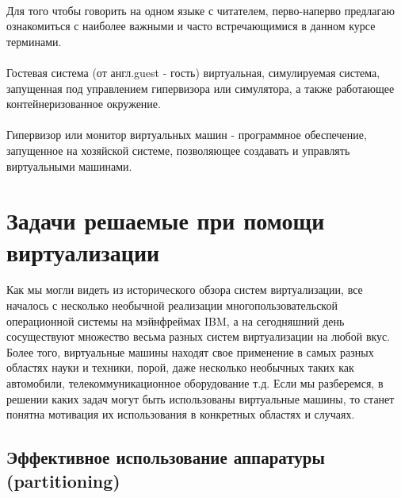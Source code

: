 \documentclass[14pt, a4paper]{article}
\begin{document}
\\

\noindent Для того чтобы говорить на одном языке с читателем, перво-наперво предлагаю
ознакомиться с наиболее важными и часто встречающимися в данном курсе
терминами.\\

\\

\noindent Гостевая система (от англ.guest - гость) виртуальная, симулируемая система,
запущенная под управлением гипервизора или симулятора, а также работающее
контейнеризованное окружение.\\

\\

\noindent Гипервизор или монитор виртуальных машин - программное обеспечение, запущенное
на хозяйской системе, позволяющее создавать и управлять виртуальными машинами.\\

\section*{Задачи решаемые при помощи виртуализации}

Как мы могли видеть из исторического обзора систем виртуализации, все началось с
несколько необычной реализации многопользовательской операционной системы на
мэйнфреймах IBM, а на сегодняшний день сосуществуют множество весьма разных
систем виртуализации на любой вкус. Более того, виртуальные машины находят свое
применение в самых разных областях науки и техники, порой, даже несколько
необычных таких как автомобили, телекоммуникационное оборудование т.д. Если мы
разберемся, в решении каких задач могут быть использованы виртуальные машины, то
станет понятна мотивация их использования в конкретных областях и случаях.\\

\subsection*{Эффективное использование аппаратуры (partitioning)}
\end{document}
